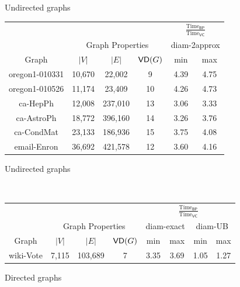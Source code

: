 \begin{figure}
  \centering
  \begin{subtable}{\textwidth}
	\centering
	\ifdmkd
	  \caption{Undirected graphs}
	  \label{tab:expUndir}
	\fi
  \begin{small}
    \begin{tabular}{cccccc}
      \toprule
      &  & & &  \multicolumn{2}{c}{$\frac{\mbox{Time}_\mathsf{BP}}{\mbox{Time}_\mathsf{VC}}$} \\
      \cmidrule(r){5-6}
      & \multicolumn{3}{c}{Graph Properties} & \multicolumn{2}{c}{diam-2approx} \\
      \cmidrule(r){2-4} \cmidrule(r){5-6}
      Graph & $|V|$ & $|E|$ & $\mathsf{VD}(G)$ & min & max \\
      \midrule
      oregon1-010331 & 10,670 & 22,002 & 9 & 4.39 & 4.75\\  %
      oregon1-010526 & 11,174 & 23,409 & 10 & 4.26 & 4.73 \\
      ca-HepPh & 12,008 & 237,010 & 13 & 3.06 & 3.33\\
      ca-AstroPh & 18,772 & 396,160  & 14 & 3.26 & 3.76\\
      ca-CondMat & 23,133 & 186,936 & 15 & 3.75 & 4.08\\
      email-Enron & 36,692 & 421,578 & 12 & 3.60 & 4.16\\
      \bottomrule
    \end{tabular}
  \end{small}
  \ifdmkd
  \else
  \caption{Undirected graphs}
  \label{tab:expUndir}
  \fi
  \end{subtable}
\ifproof
\\
\else
\hspace{-5pt}
\fi
  \begin{subtable}{\textwidth}
	\centering
	\ifdmkd
	\caption{Directed graphs}
	\label{tab:expDir}
	\fi
  \begin{small}
    \begin{tabular}{cccccccc}
      \toprule
      & & & & \multicolumn{4}{c}{$\frac{\mbox{Time}_\mathsf{BP}}{\mbox{Time}_\mathsf{VC}}$} \\
      \cmidrule(r){5-8}
      & \multicolumn{3}{c}{Graph Properties} & \multicolumn{2}{c}{diam-exact} &
      \multicolumn{2}{c}{diam-UB} \\
      \cmidrule(r){2-4} \cmidrule(r){5-6} \cmidrule(r){7-8}
      Graph & $|V|$ & $|E|$ & $\mathsf{VD}(G)$ & min & max & min & max \\
      \midrule
      wiki-Vote & 7,115 & 103,689  & 7 & 3.35 & 3.69 & 1.05 & 1.27 \\

\end{tabular}
\end{small}
\end{subtable}
\end{figure}
